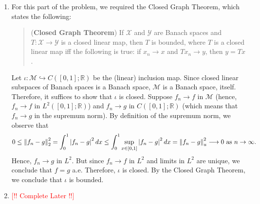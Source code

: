 \documentclass{article}
\begin{document}
\begin{solutions}
	\vspace{-0.35cm}
	\begin{enumerate}[itemsep =-2pt,label = (\alph{*})]
		\item For this part of the problem, we required the Closed Graph Theorem, which states the following: 
			\begin{quote}
				(\textbf{Closed Graph Theorem}) If $\mathscr{X}$ and $\mathscr{Y}$ are Banach spaces and $T: \mathscr{X} \to \mathscr{Y}$ is a closed linear map, then $T$ is bounded, where $T$ is a closed linear map iff the following is true: if $x_{n} \to x$ and $Tx_{n} \to y$, then $y = Tx$. 
			\end{quote}
		Let $\iota: \mathscr{M} \hookrightarrow C([0,1];\mathbb{R})$ be the (linear) inclusion map. Since closed linear subspaces of Banach spaces is a Banach space, $\mathscr{M}$ is a Banach space, itself. Therefore, it suffices to show that $\iota$ is closed. Suppose $f_{n} \to f$ in $\mathscr{M}$ (hence, $f_{n} \to f$ in $L^{2}([0,1];\mathbb{R})$) and $f_{n} \to g$ in $C([0,1];\mathbb{R})$ (which means that $f_{n} \to g$ in the supremum norm). By definition of the supremum norm, we observe that 
			\begin{equation}
				0 \leq \left\Vert f_{n} - g \right\Vert_{2}^{2} = \int_{0}^{1} \left| f_{n} - g \right|^{2}dx \leq \int_{0}^{1}\sup_{x \in [0,1]}\left| f_{n} - g \right|^{2}dx = \left\Vert f_{n} - g \right\Vert_{u}^{2} \longrightarrow 0 \text{ as $n \to \infty$}. 
			\end{equation}
		Hence, $f_{n} \to g$ in $L^{2}$. But since $f_{n} \to f$ in $L^{2}$ and limits in $L^{2}$ are unique, we conclude that $f = g$ a.e. Therefore, $\iota$ is closed. By the Closed Graph Theorem, we conclude that $\iota$ is bounded. 
		\item \textcolor{red}{[!! Complete Later !!]}
	\end{enumerate}
\end{solutions} 
\end{document}
